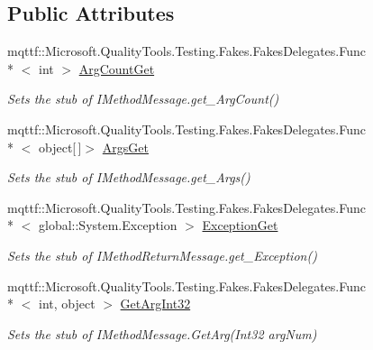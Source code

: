 \subsection*{Public Attributes}
\begin{DoxyCompactItemize}
\item 
mqttf\-::\-Microsoft.\-Quality\-Tools.\-Testing.\-Fakes.\-Fakes\-Delegates.\-Func\\*
$<$ int $>$ \hyperlink{class_system_1_1_runtime_1_1_remoting_1_1_messaging_1_1_fakes_1_1_stub_i_method_return_message_afabeab720ac2516806503c2240a7461c}{Arg\-Count\-Get}
\begin{DoxyCompactList}\small\item\em Sets the stub of I\-Method\-Message.\-get\-\_\-\-Arg\-Count()\end{DoxyCompactList}\item 
mqttf\-::\-Microsoft.\-Quality\-Tools.\-Testing.\-Fakes.\-Fakes\-Delegates.\-Func\\*
$<$ object\mbox{[}$\,$\mbox{]}$>$ \hyperlink{class_system_1_1_runtime_1_1_remoting_1_1_messaging_1_1_fakes_1_1_stub_i_method_return_message_a504822d5712f098a94748973b98b7b22}{Args\-Get}
\begin{DoxyCompactList}\small\item\em Sets the stub of I\-Method\-Message.\-get\-\_\-\-Args()\end{DoxyCompactList}\item 
mqttf\-::\-Microsoft.\-Quality\-Tools.\-Testing.\-Fakes.\-Fakes\-Delegates.\-Func\\*
$<$ global\-::\-System.\-Exception $>$ \hyperlink{class_system_1_1_runtime_1_1_remoting_1_1_messaging_1_1_fakes_1_1_stub_i_method_return_message_a2148a780b334f85e90c51f74d08a4cd7}{Exception\-Get}
\begin{DoxyCompactList}\small\item\em Sets the stub of I\-Method\-Return\-Message.\-get\-\_\-\-Exception()\end{DoxyCompactList}\item 
mqttf\-::\-Microsoft.\-Quality\-Tools.\-Testing.\-Fakes.\-Fakes\-Delegates.\-Func\\*
$<$ int, object $>$ \hyperlink{class_system_1_1_runtime_1_1_remoting_1_1_messaging_1_1_fakes_1_1_stub_i_method_return_message_a357ec218838cfadefcea49509a1cb5f7}{Get\-Arg\-Int32}
\begin{DoxyCompactList}\small\item\em Sets the stub of I\-Method\-Message.\-Get\-Arg(\-Int32 arg\-Num)\end{DoxyCompactList}\item 

\end{DoxyCompactItemize}
